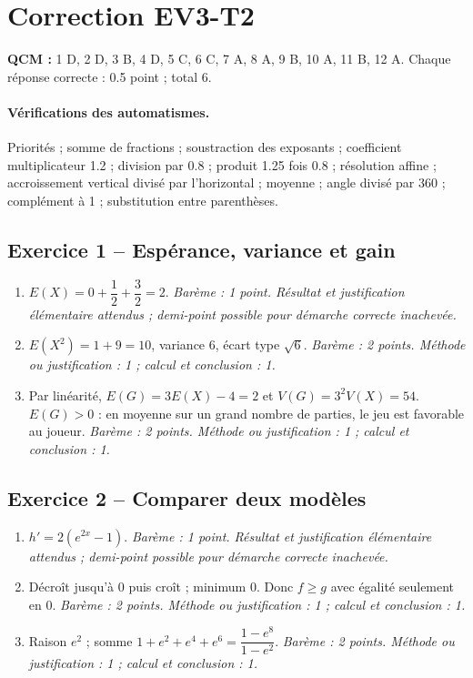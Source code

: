 \mxnewpage\section*{Correction EV3-T2}\label{EV3-T2-CORR}
\textbf{QCM :} 1 D, 2 D, 3 B, 4 D, 5 C, 6 C, 7 A, 8 A, 9 B, 10 A, 11 B, 12 A. Chaque réponse correcte : \num{0,5} point ; total 6.
\paragraph{Vérifications des automatismes.} Priorités ; somme de fractions ; soustraction des exposants ; coefficient multiplicateur \num{1,2} ; division par \num{0,8} ; produit \num{1,25} fois \num{0,8} ; résolution affine ; accroissement vertical divisé par l’horizontal ; moyenne ; angle divisé par 360 ; complément à 1 ; substitution entre parenthèses.
\subsection*{Exercice 1 -- Espérance, variance et gain}
\begin{enumerate}
\item $E(X)=0+\dfrac{1}{2}+\dfrac{3}{2}=2$. \textit{Barème : 1 point. Résultat et justification élémentaire attendus ; demi-point possible pour démarche correcte inachevée.}
\item $E(X^2)=1+9=10$, variance 6, écart type $\sqrt6$. \textit{Barème : 2 points. Méthode ou justification : 1 ; calcul et conclusion : 1.}
\item Par linéarité, $E(G)=3E(X)-4=2$ et $V(G)=3^2V(X)=54$. $E(G)>0$ : en moyenne sur un grand nombre de parties, le jeu est favorable au joueur. \textit{Barème : 2 points. Méthode ou justification : 1 ; calcul et conclusion : 1.}
\end{enumerate}
\subsection*{Exercice 2 -- Comparer deux modèles}
\begin{enumerate}
\item $h\prime=2(e^{2x}-1)$. \textit{Barème : 1 point. Résultat et justification élémentaire attendus ; demi-point possible pour démarche correcte inachevée.}
\item Décroît jusqu’à 0 puis croît ; minimum 0. Donc $f\geq g$ avec égalité seulement en 0. \textit{Barème : 2 points. Méthode ou justification : 1 ; calcul et conclusion : 1.}
\item Raison $e^2$ ; somme $1+e^2+e^4+e^6=\dfrac{1-e^8}{1-e^2}$. \textit{Barème : 2 points. Méthode ou justification : 1 ; calcul et conclusion : 1.}
\end{enumerate}
